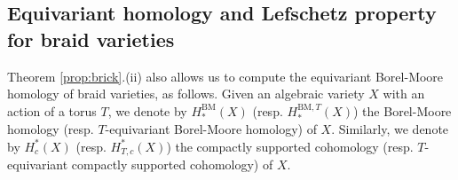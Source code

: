 \documentclass[10pt]{amsart}
\theoremstyle{plain}
\newtheorem{prop}[thm]{Proposition}
\theoremstyle{definition}
\newtheorem{remark}[thm]{Remark}
\theoremstyle{remark}
\numberwithin{equation}{section}
\newcommand{\BM}{\mathrm{BM}}
\newcommand{\bC}{\mathbb{C}}
\newcommand{\cB}{\mathcal{B}}
\newcommand{\brick}{\operatorname{brick}}
\newcommand{\s}{\sigma}
\DeclareRobustCommand{\ateb}{\text{\reflectbox{$\beta$}}}
\DeclareRobustCommand{\um}{\text{\reflectbox{$\mu$}}}
\begin{document}

\subsection{Equivariant homology and Lefschetz property for braid varieties}\label{ssec:equiv_hom} Theorem \ref{prop:brick}.(ii) also allows us to compute the equivariant Borel-Moore homology of braid varieties, as follows. Given an algebraic variety $X$ with an action of a torus $T$, we denote by $H^{\BM}_*(X)$ (resp. $H^{\BM,T}_*(X)$) the  Borel-Moore homology (resp. $T$-equivariant Borel-Moore homology) of $X$. Similarly, we denote by $H^{*}_{c}(X)$ (resp. $H^{*}_{T,c}(X)$) the compactly supported cohomology (resp. $T$-equivariant compactly supported cohomology) of $X$. 
\end{document}
